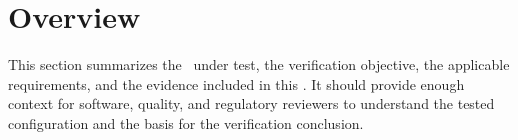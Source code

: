 \section{Overview}
This section summarizes the \stdCfgItem\ under test, the verification objective,
the applicable requirements, and the evidence included in this \stdRptPkg.  It
should provide enough context for software, quality, and regulatory reviewers to
understand the tested configuration and the basis for the verification
conclusion.
